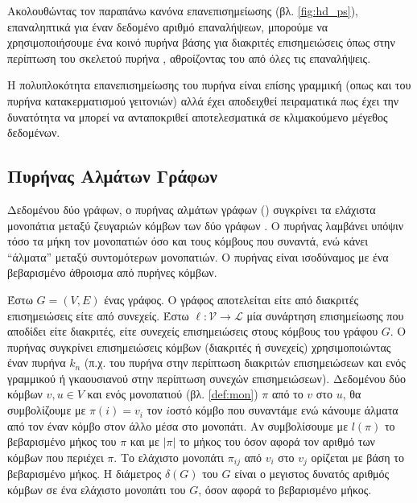 Ακολουθώντας τον παραπάνω κανόνα επανεπισημείωσης (βλ. \ref{fig:hd_ps}), επαναληπτικά για έναν δεδομένο αριθμό επαναλήψεων, μπορούμε να χρησιμοποιήσουμε ένα κοινό πυρήνα βάσης για διακριτές επισημειώσεις όπως στην περίπτωση του σκελετού πυρήνα , αθροίζοντας του από όλες τις επαναλήψεις.

Η πολυπλοκότητα επανεπισημείωσης του πυρήνα  είναι επίσης γραμμική (οπως και του πυρήνα κατακερματισμού γειτονιών) αλλά έχει αποδειχθεί πειραματικά πως έχει την δυνατότητα να μπορεί να ανταποκριθεί αποτελεσματικά σε κλιμακούμενο μέγεθος δεδομένων.

\subsection{Πυρήνας Αλμάτων Γράφων}
Δεδομένου δύο γράφων, ο πυρήνας αλμάτων γράφων () συγκρίνει τα ελάχιστα μονοπάτια μεταξύ ζευγαριών κόμβων των δύο γράφων \cite{feragen2013scalable}.
Ο πυρήνας λαμβάνει υπόψιν τόσο τα μήκη τον μονοπατιών όσο και τους κόμβους που συναντά, ενώ κάνει ``άλματα'' μεταξύ συντομότερων μονοπατιών.
Ο πυρήνας είναι ισοδύναμος με ένα βεβαρισμένο άθροισμα από πυρήνες κόμβων.


Έστω $G=(V,E)$ ένας γράφος.
Ο γράφος αποτελείται είτε από διακριτές επισημειώσεις είτε από συνεχείς.
Έστω $\ell : \mathcal{V} \rightarrow \mathcal{L}$ μία συνάρτηση επισημείωσης που αποδίδει είτε διακριτές, είτε συνεχείς επισημειώσεις στους κόμβους του γράφου $G$.
Ο πυρήνας συγκρίνει επισημειώσεις κόμβων (διακριτές ή συνεχείς) χρησιμοποιώντας έναν πυρήνα $k_n$ (π.χ. του πυρήνα  στην περίπτωση διακριτών επισημειώσεων και ενός γραμμικού ή γκαουσιανού στην περίπτωση συνεχών επισημειώσεων).
Δεδομένου δύο κόμβων $v,u \in V$ και ενός μονοπατιού (βλ. \ref{def:mon}) $\pi$ από το $v$ στο $u$, θα συμβολίζουμε με $\pi(i) = v_i$ τον $i$οστό κόμβο που συναντάμε ενώ κάνουμε άλματα από τον έναν κόμβο στον άλλο μέσα στο μονοπάτι.
Αν συμβολίσουμε με $l(\pi)$ το βεβαρισμένο μήκος του $\pi$ και με $|\pi|$ το μήκος του όσον αφορά τον αριθμό των κόμβων που περιέχει $\pi$.
Το ελάχιστο μονοπάτι $\pi_{ij}$ από $v_i$ στο $v_j$ ορίζεται με βάση το βεβαρισμένο μήκος.
Η διάμετρος $\delta(G)$ του $G$ είναι ο μεγιστος δυνατός αριθμός κόμβων σε ένα ελάχιστο μονοπάτι του $G$, όσον αφορά το βεβαρισμένο μήκος.

